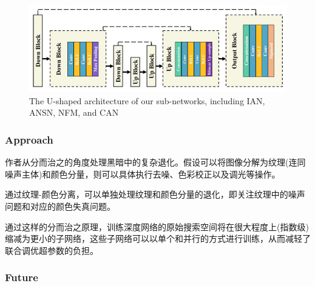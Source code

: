 \documentclass[letterpaper,10pt]{article}
\begin{document}
			\begin{figure}[htbp]
				\centering 
				\includegraphics[width=\columnwidth]{picture/LLIE/U-shaped}
				\caption{
					\label{fig: U-shaped} 
					The U-shaped architecture of our sub-networks, including IAN, ANSN, NFM, and CAN
				}
			\end{figure}
			
			\subsubsection{Approach}
			
			作者从分而治之的角度处理黑暗中的复杂退化。假设可以将图像分解为纹理(连同噪声主体)和颜色分量，则可以具体执行去噪、色彩校正以及调光等操作。
			
			通过纹理-颜色分离，可以单独处理纹理和颜色分量的退化，即关注纹理中的噪声问题和对应的颜色失真问题。
			
			通过这样的分而治之原理，训练深度网络的原始搜索空间将在很大程度上(指数级)缩减为更小的子网络，这些子网络可以以单个和并行的方式进行训练，从而减轻了联合调优超参数的负担。
			
			\subsubsection{Future}
			
\end{document}
